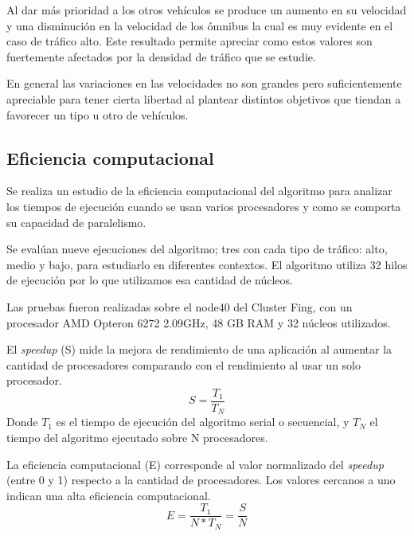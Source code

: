 Al dar más prioridad a los otros vehículos se produce un aumento en su velocidad y una disminución en la velocidad de los ómnibus la cual es muy evidente en el caso de tráfico alto. Este resultado permite apreciar como estos valores son fuertemente afectados por la densidad de tráfico que se estudie.

En general las variaciones en las velocidades no son grandes pero suficientemente apreciable para tener cierta libertad al plantear distintos objetivos que tiendan a favorecer un tipo u otro de vehículos.


\subsection{Eficiencia computacional}

Se realiza un estudio de la eficiencia computacional del algoritmo para analizar los tiempos de ejecución cuando se usan varios procesadores y como se comporta su capacidad de paralelismo.

Se evalúan nueve ejecuciones del algoritmo; tres con cada tipo de tráfico: alto, medio y bajo, para estudiarlo en diferentes contextos. El algoritmo utiliza 32 hilos de ejecución por lo que utilizamos esa cantidad de núcleos.

Las pruebas fueron realizadas sobre el node40 del Cluster Fing, con un procesador AMD Opteron 6272 2.09GHz, 48 GB RAM y 32 núcleos utilizados.

El \emph{speedup} (S) mide la mejora de rendimiento de una aplicación al aumentar la cantidad de procesadores comparando con el rendimiento al usar un solo procesador.
\begin{equation}
\label{eq:funcion_speedup}
S = \frac{T_1}{T_N}
\end{equation}
Donde ${T_1}$ es el tiempo de ejecución del algoritmo serial o secuencial, y ${T_N}$ el tiempo del algoritmo ejecutado sobre N procesadores.
\newline

La eficiencia computacional (E) corresponde al valor normalizado del \emph{speedup} (entre 0 y 1) respecto a la cantidad de procesadores. Los valores cercanos a uno indican una alta eficiencia computacional.
\begin{equation}
\label{eq:funcion_eficiencia}
E = \frac{T_1}{N*T_N} = \frac{S}{N}
\end{equation}



